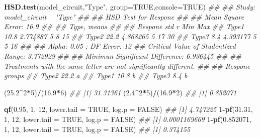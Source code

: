 \documentclass[]{article}
\newenvironment{Shaded}{\begin{snugshade}}{\end{snugshade}}
\newcommand{\CommentTok}[1]{\textcolor[rgb]{0.56,0.35,0.01}{\textit{#1}}}
\newcommand{\DataTypeTok}[1]{\textcolor[rgb]{0.13,0.29,0.53}{#1}}
\newcommand{\DecValTok}[1]{\textcolor[rgb]{0.00,0.00,0.81}{#1}}
\newcommand{\FloatTok}[1]{\textcolor[rgb]{0.00,0.00,0.81}{#1}}
\newcommand{\KeywordTok}[1]{\textcolor[rgb]{0.13,0.29,0.53}{\textbf{#1}}}
\newcommand{\NormalTok}[1]{#1}
\newcommand{\OperatorTok}[1]{\textcolor[rgb]{0.81,0.36,0.00}{\textbf{#1}}}
\newcommand{\OtherTok}[1]{\textcolor[rgb]{0.56,0.35,0.01}{#1}}
\newcommand{\StringTok}[1]{\textcolor[rgb]{0.31,0.60,0.02}{#1}}
\begin{document}
\begin{Shaded}
\begin{Highlighting}[]
\KeywordTok{HSD.test}\NormalTok{(model_circuit,}\StringTok{"Type"}\NormalTok{, }\DataTypeTok{group=}\OtherTok{TRUE}\NormalTok{,}\DataTypeTok{console=}\OtherTok{TRUE}\NormalTok{)}
\CommentTok{## }
\CommentTok{## Study: model_circuit ~ "Type"}
\CommentTok{## }
\CommentTok{## HSD Test for Respone }
\CommentTok{## }
\CommentTok{## Mean Square Error:  16.9 }
\CommentTok{## }
\CommentTok{## Type,  means}
\CommentTok{## }
\CommentTok{##       Respone      std r Min Max}
\CommentTok{## Type1    10.8 2.774887 5   8  15}
\CommentTok{## Type2    22.2 4.868265 5  17  30}
\CommentTok{## Type3     8.4 4.393177 5   5  16}
\CommentTok{## }
\CommentTok{## Alpha: 0.05 ; DF Error: 12 }
\CommentTok{## Critical Value of Studentized Range: 3.772929 }
\CommentTok{## }
\CommentTok{## Minimun Significant Difference: 6.936445 }
\CommentTok{## }
\CommentTok{## Treatments with the same letter are not significantly different.}
\CommentTok{## }
\CommentTok{##       Respone groups}
\CommentTok{## Type2    22.2      a}
\CommentTok{## Type1    10.8      b}
\CommentTok{## Type3     8.4      b}

\NormalTok{(}\FloatTok{25.2}\OperatorTok{^}\DecValTok{2}\OperatorTok{*}\DecValTok{5}\NormalTok{)}\OperatorTok{/}\NormalTok{(}\FloatTok{16.9}\OperatorTok{*}\DecValTok{6}\NormalTok{)}
\CommentTok{## [1] 31.31361}
\NormalTok{(}\FloatTok{2.4}\OperatorTok{^}\DecValTok{2}\OperatorTok{*}\DecValTok{5}\NormalTok{)}\OperatorTok{/}\NormalTok{(}\FloatTok{16.9}\OperatorTok{*}\DecValTok{2}\NormalTok{)}
\CommentTok{## [1] 0.852071}

\KeywordTok{qf}\NormalTok{(}\FloatTok{0.95}\NormalTok{, }\DecValTok{1}\NormalTok{, }\DecValTok{12}\NormalTok{, }\DataTypeTok{lower.tail =} \OtherTok{TRUE}\NormalTok{, }\DataTypeTok{log.p =} \OtherTok{FALSE}\NormalTok{)}
\CommentTok{## [1] 4.747225}
\DecValTok{1}\OperatorTok{-}\KeywordTok{pf}\NormalTok{(}\FloatTok{31.31}\NormalTok{, }\DecValTok{1}\NormalTok{, }\DecValTok{12}\NormalTok{, }\DataTypeTok{lower.tail =} \OtherTok{TRUE}\NormalTok{, }\DataTypeTok{log.p =} \OtherTok{FALSE}\NormalTok{)}
\CommentTok{## [1] 0.0001169669}
\DecValTok{1}\OperatorTok{-}\KeywordTok{pf}\NormalTok{(}\FloatTok{0.852071}\NormalTok{, }\DecValTok{1}\NormalTok{, }\DecValTok{12}\NormalTok{, }\DataTypeTok{lower.tail =} \OtherTok{TRUE}\NormalTok{, }\DataTypeTok{log.p =} \OtherTok{FALSE}\NormalTok{)}
\CommentTok{## [1] 0.374155}
\end{Highlighting}
\end{Shaded}
\end{document}

